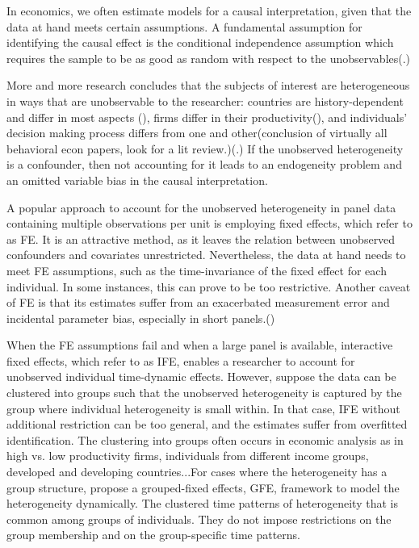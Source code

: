 In economics, we often estimate models for a causal interpretation, given that the data at hand meets certain assumptions.
A fundamental assumption for identifying the causal effect is the conditional independence assumption which requires the sample to be as good as random with respect to the unobservables(\cite{angrist2008mostly}.)

More and more research concludes that the subjects of interest are heterogeneous in ways that are unobservable to the researcher: countries are history-dependent and differ in most aspects (\cite{acemoglu2005institutions}), firms differ in their productivity(\cite{card2018firms}), and individuals' decision making process differs from one and other(conclusion of virtually all behavioral econ papers, look for a lit review.)(\cite{von2011heterogeneity}.) If the unobserved heterogeneity is a confounder, then not accounting for it leads to an endogeneity problem and an omitted variable bias in the causal interpretation. 

A popular approach to account for the unobserved heterogeneity in panel data containing multiple observations per unit is employing fixed effects, which refer to as FE. It is an attractive method, as it leaves the relation between unobserved confounders and covariates unrestricted. Nevertheless, the data at hand needs to meet FE assumptions, such as the time-invariance of the fixed effect for each individual. In some instances, this can prove to be too restrictive. Another caveat of FE is that its estimates suffer from an exacerbated measurement error and incidental parameter bias, especially in short panels.(\cite{heckman1987incidental})

When the FE assumptions fail and when a large panel is available, interactive fixed effects, which refer to as IFE, enables a researcher to account for unobserved individual time-dynamic effects. However, suppose the data can be clustered into groups such that the unobserved heterogeneity is captured by the group where individual heterogeneity is small within. In that case, IFE without additional restriction can be too general, and the estimates suffer from overfitted identification. The clustering into groups often occurs in economic analysis as in high vs. low productivity firms, individuals from different income groups, developed and developing countries...For cases where the heterogeneity has a group structure, \textcite{bonhomme2015grouped} propose a grouped-fixed effects, GFE, framework to model the heterogeneity dynamically. The clustered time patterns of heterogeneity that is common among groups of individuals. They do not impose restrictions on the group membership and on the group-specific time patterns.

